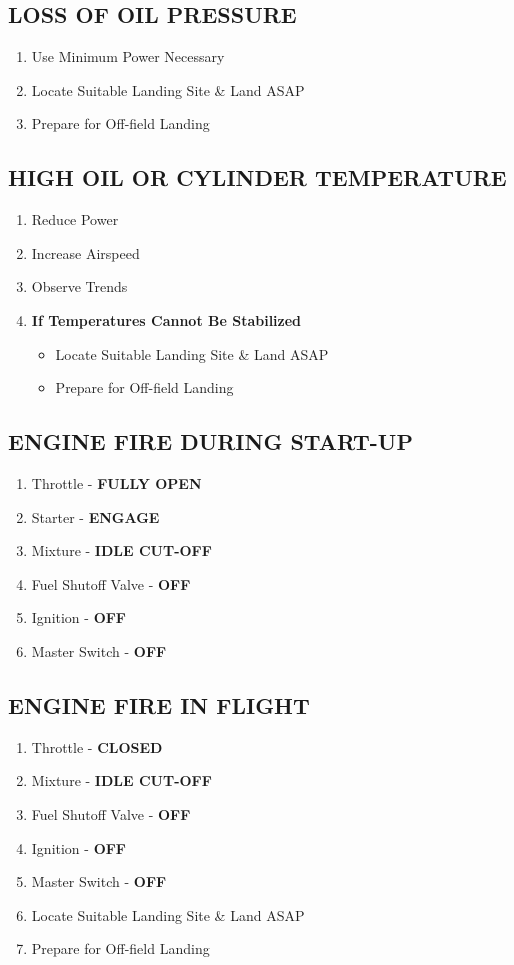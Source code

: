 \documentclass[14pt,letterpaper, twoside]{extarticle}
\begin{document}
\subsection{LOSS OF OIL PRESSURE}

\begin{enumerate}
\item Use Minimum Power Necessary
\item Locate Suitable Landing Site \& Land ASAP
\item Prepare for Off-field Landing
\end{enumerate}

\subsection{HIGH OIL OR CYLINDER TEMPERATURE}

\begin{enumerate}
\item Reduce Power
\item Increase Airspeed
\item Observe Trends
\item \textbf{If Temperatures Cannot Be Stabilized}
\begin{itemize}
\item Locate Suitable Landing Site \& Land ASAP 
\item Prepare for Off-field Landing 
\end{itemize}
\end{enumerate}

\subsection{ENGINE FIRE DURING START-UP}

\begin{enumerate}
\item Throttle - \textbf{FULLY OPEN}
\item Starter - \textbf{ENGAGE}
\item Mixture - \textbf{IDLE CUT-OFF}
\item Fuel Shutoff Valve - \textbf{OFF}
\item Ignition - \textbf{OFF}
\item Master Switch - \textbf{OFF}
\end{enumerate}

\subsection{ENGINE FIRE IN FLIGHT}

\begin{enumerate}
\item Throttle - \textbf{CLOSED}
\item Mixture - \textbf{IDLE CUT-OFF}
\item Fuel Shutoff Valve - \textbf{OFF}
\item Ignition - \textbf{OFF}
\item Master Switch - \textbf{OFF}
\item Locate Suitable Landing Site \& Land ASAP 
\item Prepare for Off-field Landing 
\end{enumerate}
\end{document}
